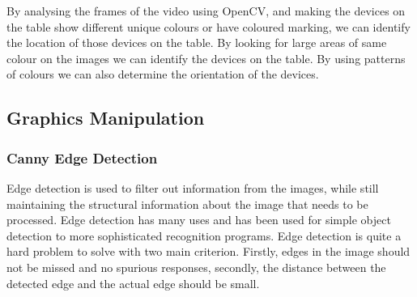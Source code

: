 By analysing the frames of the video using OpenCV, and making the devices on the table show different unique colours or have coloured marking, we can identify the location of those devices on the table. By looking for large areas of same colour on the images we can identify the devices on the table. By using patterns of colours we can also determine the orientation of the devices.


\subsection{Graphics Manipulation}
\subsubsection{Canny Edge Detection}
Edge detection is used to filter out information from the images, while still maintaining the structural information about the image that needs to be processed. Edge detection has many uses and has been used for simple object detection to more sophisticated recognition programs\cite{acronym}. Edge detection is quite a hard problem to solve with two main criterion. Firstly, edges in the image should not be missed and no spurious responses, secondly, the distance between the detected edge and the actual edge should be small\cite{canny-paper}.

